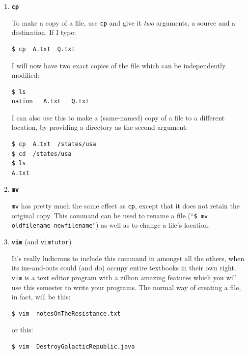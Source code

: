 \begin{enumerate}
\item \textbf{\texttt{cp}}

To make a copy of a file, use \texttt{cp} and give it \textit{two} arguments,
a source and a destination. If I type:

\begin{Verbatim}[fontsize=\small]
$ cp  A.txt  Q.txt
\end{Verbatim}

I will now have two exact copies of the file which can be independently
modified:

\begin{Verbatim}[fontsize=\small]
$ ls
nation   A.txt   Q.txt
\end{Verbatim}

I can also use this to make a (same-named) copy of a file to a different
location, by providing a directory as the second argument:

\begin{Verbatim}[fontsize=\small]
$ cp  A.txt  /states/usa
$ cd  /states/usa
$ ls
A.txt
\end{Verbatim}

\bigline

\item \textbf{\texttt{mv}}

\texttt{mv} has pretty much the same effect as \texttt{cp}, except that it
does not retain the original copy. This command can be used to rename a file
(``\texttt{\$ mv oldfilename newfilename}'') as well as to change a file's
location.

\bigline

\item \textbf{\texttt{vim}} (and \texttt{vimtutor})

It's really ludicrous to include this command in amongst all the others, when
its ins-and-outs could (and do) occupy entire textbooks in their own right.
\texttt{vim} is a text editor program with a zillion amazing features which
you will use this semester to write your programs. The normal way of creating
a file, in fact, will be this:

\begin{Verbatim}[fontsize=\small]
$ vim  notesOnTheResistance.txt
\end{Verbatim}

or this:

\begin{Verbatim}[fontsize=\small]
$ vim  DestroyGalacticRepublic.java
\end{Verbatim}


\end{enumerate}
